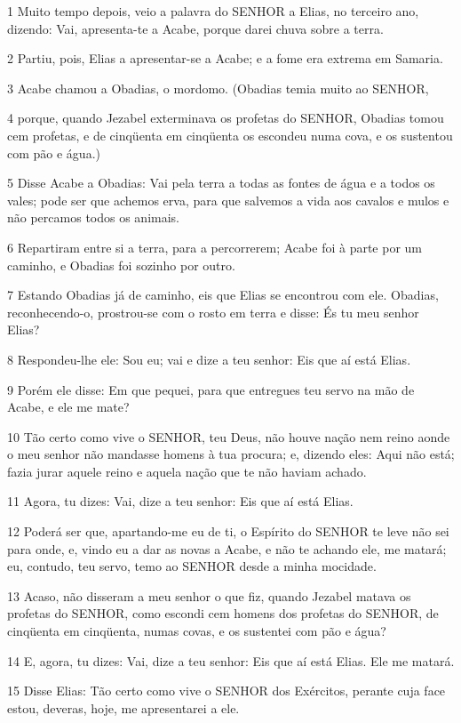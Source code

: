 \par 1 Muito tempo depois, veio a palavra do SENHOR a Elias, no terceiro ano, dizendo: Vai, apresenta-te a Acabe, porque darei chuva sobre a terra.
\par 2 Partiu, pois, Elias a apresentar-se a Acabe; e a fome era extrema em Samaria.
\par 3 Acabe chamou a Obadias, o mordomo. (Obadias temia muito ao SENHOR,
\par 4 porque, quando Jezabel exterminava os profetas do SENHOR, Obadias tomou cem profetas, e de cinqüenta em cinqüenta os escondeu numa cova, e os sustentou com pão e água.)
\par 5 Disse Acabe a Obadias: Vai pela terra a todas as fontes de água e a todos os vales; pode ser que achemos erva, para que salvemos a vida aos cavalos e mulos e não percamos todos os animais.
\par 6 Repartiram entre si a terra, para a percorrerem; Acabe foi à parte por um caminho, e Obadias foi sozinho por outro.
\par 7 Estando Obadias já de caminho, eis que Elias se encontrou com ele. Obadias, reconhecendo-o, prostrou-se com o rosto em terra e disse: És tu meu senhor Elias?
\par 8 Respondeu-lhe ele: Sou eu; vai e dize a teu senhor: Eis que aí está Elias.
\par 9 Porém ele disse: Em que pequei, para que entregues teu servo na mão de Acabe, e ele me mate?
\par 10 Tão certo como vive o SENHOR, teu Deus, não houve nação nem reino aonde o meu senhor não mandasse homens à tua procura; e, dizendo eles: Aqui não está; fazia jurar aquele reino e aquela nação que te não haviam achado.
\par 11 Agora, tu dizes: Vai, dize a teu senhor: Eis que aí está Elias.
\par 12 Poderá ser que, apartando-me eu de ti, o Espírito do SENHOR te leve não sei para onde, e, vindo eu a dar as novas a Acabe, e não te achando ele, me matará; eu, contudo, teu servo, temo ao SENHOR desde a minha mocidade.
\par 13 Acaso, não disseram a meu senhor o que fiz, quando Jezabel matava os profetas do SENHOR, como escondi cem homens dos profetas do SENHOR, de cinqüenta em cinqüenta, numas covas, e os sustentei com pão e água?
\par 14 E, agora, tu dizes: Vai, dize a teu senhor: Eis que aí está Elias. Ele me matará.
\par 15 Disse Elias: Tão certo como vive o SENHOR dos Exércitos, perante cuja face estou, deveras, hoje, me apresentarei a ele.

